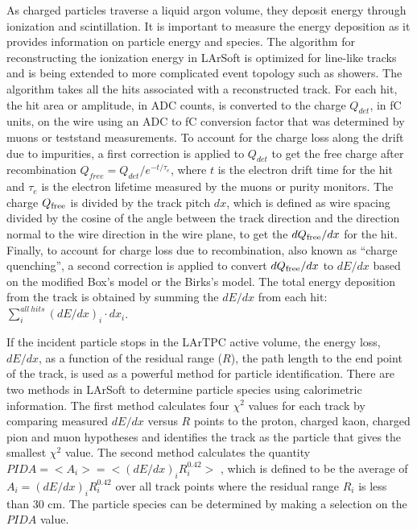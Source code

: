 As charged particles traverse a liquid argon volume, they deposit energy through ionization and scintillation. It is important to measure the energy deposition as it provides information on particle energy and species. The algorithm for reconstructing the ionization energy in LArSoft is optimized for line-like tracks and is being extended to more complicated event topology such as showers. The algorithm takes all the hits associated with a reconstructed track. For each hit, the hit area or amplitude, in ADC counts, is converted to the charge $Q_{det}$, in fC units, on the wire using an ADC to fC conversion factor that was determined by muons or teststand measurements. To account for the charge loss along the drift due to impurities, a first correction is applied to $Q_{det}$ to get the free charge after recombination $Q_{free} = Q_{det}/e^{-t/\tau_{e}}$, where $t$ is the electron drift time for the hit and $\tau_{e}$ is the electron lifetime measured by the muons or purity monitors. The charge $Q_{\rm{free}}$ is divided by the track pitch $dx$, which is defined as wire spacing divided by the cosine of the angle between the track direction and the direction normal to the wire direction in the wire plane, to get the $dQ_{\rm{free}}/dx$ for the hit. Finally, to account for charge loss due to recombination, also known as ``charge quenching'', a second correction is applied to convert $dQ_{\rm{free}}/dx$ to $dE/dx$ based on the modified Box's model \cite{Acciarri:2013met} or the Birks's model\cite{Amoruso:2004dy}. The total energy deposition from the track is obtained by summing the $dE/dx$ from each hit: $\sum\limits_{i}^{all\ hits}(dE/dx)_{i}\cdot dx_{i}$.

If the incident particle stops in the LArTPC active volume, the energy loss, $dE/dx$, as a function of the residual range ($R$), the path length to the end point of the track, is used as a powerful method for particle identification. There are two methods in LArSoft to determine particle species using calorimetric information. The first method calculates four $\chi^{2}$ values for each track by comparing measured $dE/dx$ versus $R$ points to the proton, charged kaon, charged pion and muon hypotheses and identifies the track as the particle that gives the smallest $\chi^{2}$ value. The second method calculates the quantity $PIDA = <A_{i}> = <(dE/dx)_{i}R_{i}^{0.42}>$ \cite{Acciarri:2013met}, which is defined to be the average of $A_{i} = (dE/dx)_{i}R_{i}^{0.42}$ over all track points where the residual range $R_{i}$ is less than 30 cm. The particle species can be determined by making a selection on the $PIDA$ value. 

